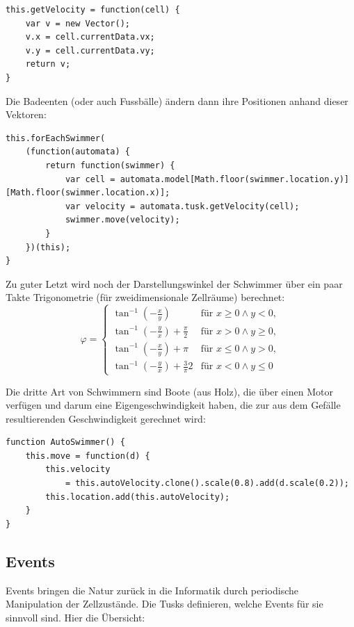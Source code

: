 \documentclass[11pt]{report} %
\theoremstyle{definition}
\begin{document}
\begin{lstlisting}
this.getVelocity = function(cell) {
	var v = new Vector();
	v.x = cell.currentData.vx;
	v.y = cell.currentData.vy;
	return v;
}
\end{lstlisting}

Die Badeenten (oder auch Fussbälle) ändern dann ihre Positionen anhand dieser Vektoren:
\begin{lstlisting}
this.forEachSwimmer(
	(function(automata) {
		return function(swimmer) {
			var cell = automata.model[Math.floor(swimmer.location.y)][Math.floor(swimmer.location.x)];
			var velocity = automata.tusk.getVelocity(cell);
			swimmer.move(velocity);
		}
	})(this);
}

\end{lstlisting}

Zu guter Letzt wird noch der Darstellungswinkel der Schwimmer über ein paar Takte Trigonometrie (für zweidimensionale Zellräume) berechnet:
\[
\varphi = \begin{cases}
\tan^{-1} \left(-\frac x y\right) & \textrm{für } x \ge 0 \land y < 0, \\
\tan^{-1} \left(-\frac y x\right)  + \frac \pi 2& \textrm{für } x > 0 \land y \ge 0, \\
\tan^{-1} \left(-\frac x y\right)  + \pi& \textrm{für } x \le 0 \land y > 0, \\
\tan^{-1} \left(-\frac y x\right)  + \frac 3\pi 2& \textrm{für } x < 0 \land y \le 0
\end{cases}
\]

Die dritte Art von Schwimmern sind Boote (aus Holz), die über einen Motor verfügen und darum eine Eigengeschwindigkeit haben, die zur aus dem Gefälle resultierenden Geschwindigkeit gerechnet wird:

\begin{lstlisting}
function AutoSwimmer() {
	this.move = function(d) {
		this.velocity
			= this.autoVelocity.clone().scale(0.8).add(d.scale(0.2));
		this.location.add(this.autoVelocity);
	}
}
\end{lstlisting}

\subsection{Events}

Events bringen die Natur zurück in die Informatik durch periodische Manipulation der Zellzustände. Die Tusks definieren, welche Events für sie sinnvoll sind. Hier die Übersicht:
\end{document}
